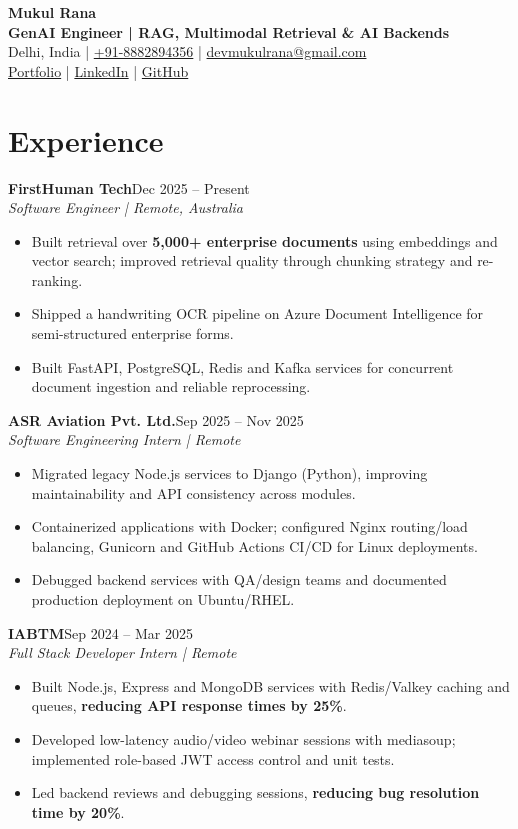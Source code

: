 \documentclass[letterpaper,10pt]{article}
\newcommand{\entry}[4]{%
  \textbf{#1}\hfill #2\\
  \textit{#3}\hfill #4\par
}
\begin{document}
\fontsize{10.5pt}{12.3pt}\selectfont
\raggedright
{}
\begin{center}
{\LARGE\textbf{Mukul Rana}}\\[2pt]
\textbf{GenAI Engineer | RAG, Multimodal Retrieval \& AI Backends}\\[1pt]
Delhi, India | \href{tel:+918882894356}{+91-8882894356} |
\href{mailto:devmukulrana@gmail.com}{devmukulrana@gmail.com}\\
\href{https://mukulranadev.in}{Portfolio} |
\href{https://linkedin.com/in/mukul-webdev}{LinkedIn} |
\href{https://github.com/mukulpythondev}{GitHub}
\end{center}
\vspace{-8pt}

\section*{Experience}
\entry{FirstHuman Tech}{Dec 2025 -- Present}{Software Engineer | Remote, Australia}{}
\begin{itemize}
  \item Built retrieval over \textbf{5,000+ enterprise documents} using embeddings and vector search; improved retrieval quality through chunking strategy and re-ranking.
  \item Shipped a handwriting OCR pipeline on Azure Document Intelligence for semi-structured enterprise forms.
  \item Built FastAPI, PostgreSQL, Redis and Kafka services for concurrent document ingestion and reliable reprocessing.
\end{itemize}
\vspace{3pt}
\entry{ASR Aviation Pvt. Ltd.}{Sep 2025 -- Nov 2025}{Software Engineering Intern | Remote}{}
\begin{itemize}
  \item Migrated legacy Node.js services to Django (Python), improving maintainability and API consistency across modules.
  \item Containerized applications with Docker; configured Nginx routing/load balancing, Gunicorn and GitHub Actions CI/CD for Linux deployments.
  \item Debugged backend services with QA/design teams and documented production deployment on Ubuntu/RHEL.
\end{itemize}
\vspace{3pt}
\entry{IABTM}{Sep 2024 -- Mar 2025}{Full Stack Developer Intern | Remote}{}
\begin{itemize}
  \item Built Node.js, Express and MongoDB services with Redis/Valkey caching and queues, \textbf{reducing API response times by 25\%}.
  \item Developed low-latency audio/video webinar sessions with mediasoup; implemented role-based JWT access control and unit tests.
  \item Led backend reviews and debugging sessions, \textbf{reducing bug resolution time by 20\%}.
\end{itemize}
\end{document}
